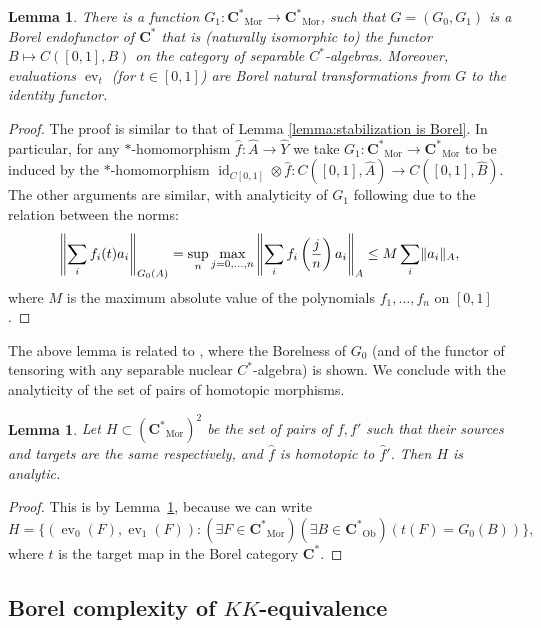 \documentclass[12pt]{amsart}
\newtheorem{lemma}[theorem]{Lemma}
\DeclareMathOperator{\id}{id}
\DeclareMathOperator{\Mor}{Mor}
\DeclareMathOperator{\Ob}{Ob}
\DeclareMathOperator{\ev}{ev}
\newcommand{\Cstar}{\mathbf{C^*}} %
\DeclarePairedDelimiter{\norm}{\lVert}{\rVert}
\begin{document}
\begin{lemma}\label{lemma:continuous_functions_from_01_to_x_Borel_functor}
    There is a function $G_1 \colon \Cstar_{\Mor} \to \Cstar_{\Mor}$, such that $G=(G_0,G_1)$ is a Borel endofunctor of $\Cstar$ that is (naturally isomorphic to) the functor $B \mapsto C([0,1], B)$ on the category of separable $C^*$-algebras. Moreover, evaluations $\ev_t$ (for $t \in [0,1]$) are Borel natural transformations from $G$ to the identity functor. 
\end{lemma}
\begin{proof}
    The proof is similar to that of Lemma \ref{lemma:stabilization is Borel}. In particular, for any $*$-homomorphism $\widehat{f} \colon \widehat{A} \rightarrow \widehat{Y}$ we take $G_1 \colon \Cstar_{\Mor} \rightarrow \Cstar_{\Mor}$ to be induced by the $*$-homomorphism $\id_{C[0,1]} \otimes \widehat{f} \colon C([0,1], \widehat{A}) \rightarrow C([0,1], \widehat{B})$.  The other arguments are similar, with analyticity of $G_1$ following due to the relation between the norms:
    \[
        \left \lVert \sum_i f_i(t) a_i \right \rVert_{G_0(A)}  = \sup_n \max_{j = 0, \dots, n} \left \lVert \sum_i f_i \left( \frac{j}{n} \right) a_i \right \rVert_A \leq M \sum_i \norm{a_i}_{A},
    \]
    where $M$ is the maximum absolute value of the polynomials $f_1, \dots, f_n$ on $[0,1]$.
    
\end{proof}

The above lemma is related to \cite[Lemma 3.10]{Farahturbulence2014}, where the Borelness of $G_0$ (and of the functor of tensoring with any separable nuclear $C^*$-algebra) is shown. We conclude with the analyticity of the set of pairs of homotopic morphisms.

\begin{lemma}\label{lemma:pairs_of_homotopic_maps}
    Let $H \subset (\Cstar_{\Mor})^2$ be the set of pairs of $f, f'$ such that their sources and targets are the same respectively, and $\widehat{f}$ is homotopic to $\widehat{f}'$. Then $H$ is analytic.
\end{lemma}
\begin{proof}
    This is by Lemma~\ref{lemma:continuous_functions_from_01_to_x_Borel_functor}, because we can write
    \[ H = \{ (\ev_0(F) , \ev_1(F)) \colon (\exists F \in \Cstar_{\Mor})(\exists B \in \Cstar_{\Ob}) (t(F) = G_0(B)) \}, \]
    where $t$ is the target map in the Borel category $\Cstar$.
\end{proof}

\subsection{Borel complexity of $KK$-equivalence}\label{section: analycity of KK}
\end{document}
